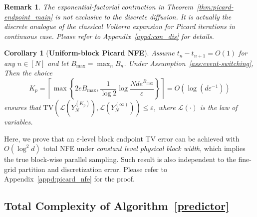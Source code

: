 \documentclass{article}
\newtheorem{corollary}{Corollary}[section]
\newtheorem{remark}{Remark}[section]
\newcommand{\TV}{\mathrm{TV}}
\newcommand{\Law}{\mathcal{L}}
\newcommand{\NFE}{\mathrm{NFE}}
\begin{document}
\begin{remark}
The exponential-factorial contraction in Theorem~\ref{thm:picard-endpoint_main} is not exclusive to the discrete diffusion. It is actually the discrete analogue of the classical Volterra expansion for Picard iterations in continuous case. Please refer to Appendix~\ref{appd:con_dis} for details.
\end{remark}

\begin{corollary}[\bf Uniform-block Picard NFE]
\label{cor:picard-nfe_main}
Assume $t_n-t_{n+1}=O(1)$ for any $n \in [N]$ and let $B_{\max}=\max_n B_n$.
Under Assumption~\ref{ass:event-switching},  Then the choice
\[
K_p=\left\lceil
\max\left\{2eB_{\max},\frac{1}{\log 2}\log\frac{Nd e^{B_{\max}}}{\varepsilon}\right\}
\right\rceil =O\left(\log (d\varepsilon^{-1})\right)
\]
ensures that $\TV(\Law(Y_N^{(K_p)}),\Law(Y_N^{(\infty)}))\leq \varepsilon$, where $\Law(\cdot)$ is the law of variables. 
\end{corollary}
Here, we prove that an $\varepsilon$-level block endpoint TV error can be achieved with $O(\log^2 d)$ total NFE under \emph{constant level physical block width}, which implies the true block-wise parallel sampling. Such result is also independent to the fine-grid partition and discretization error.
Please refer to Appendix~\ref{appd:picard_nfe} for the proof.


\subsection{Total Complexity of Algorithm~\ref{predictor}}
\label{sec:global-theory}
\end{document}
